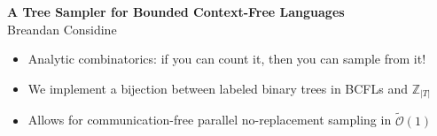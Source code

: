 \documentclass[portrait,a0b,final,a4resizeable]{a0poster}
\def\jointspacing{\vspace{0.3in}}
\begin{document}
  \begin{poster}
    \vspace{-0.3cm}
    \begin{center}
      \begin{pcolumn}{1.03}
        \begin{minipage}[c][9cm][c]{0.85\textwidth}
          \begin{center}
          {\veryHuge \textbf{A Tree Sampler for Bounded Context-Free Languages}}\\[10mm]
          {\huge Breandan Considine}
          \end{center}
        \end{minipage}
      \end{pcolumn}
    \end{center}

    \vspace*{-0.5cm}

    \large



    \Large

    \begin{multicols}{2}



      \vspace*{-1cm}
      \null\hspace*{2.5cm}\begin{minipage}[c]{0.88\columnwidth}
      \renewcommand\labelitemi{$\vcenter{\hbox{\small$\bullet$}}$}
      \begin{itemize}
        \item {} Analytic combinatorics: if you can count it, then you can sample from it!
        \item {} We implement a bijection between labeled binary trees in BCFLs and $\mathbb{Z}_{|T|}$
        \item {} Allows for communication-free parallel no-replacement sampling in $\widetilde{\mathcal{O}}(1)$
      \end{itemize}
      \end{minipage}

      \jointspacing


\end{multicols}
\end{poster}
\end{document}

